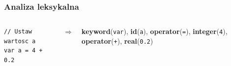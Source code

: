\documentclass{beamer}
\begin{document}
	\begin{frame}[fragile]
		\frametitle{Analiza leksykalna}
		\begin{columns}
			\begin{column}{0.5\textwidth}
				\newline\newline
			\end{column}
			\begin{column}{0.5\textwidth}
				\newline\newline
			\end{column}
		\end{columns}
		\begin{columns}
			\begin{column}{0.45\textwidth}
				\begin{lstlisting}
// Ustaw wartosc a
var a = 4 + 0.2
				\end{lstlisting}
			\end{column}
			\begin{column}{0.1\textwidth}
$\Rightarrow$
			\end{column}
			\begin{column}{0.45\textwidth}
				\textbf{keyword}(\texttt{var}),\newline
				\textbf{id}(\texttt{a}),\newline
				\textbf{operator}(\texttt{=}),\newline
				\textbf{integer}(\texttt{4}),\newline
				\textbf{operator}(\texttt{+}),\newline
				\textbf{real}(\texttt{0.2})
			\end{column}
		\end{columns}
	\end{frame}
	
\end{document}
